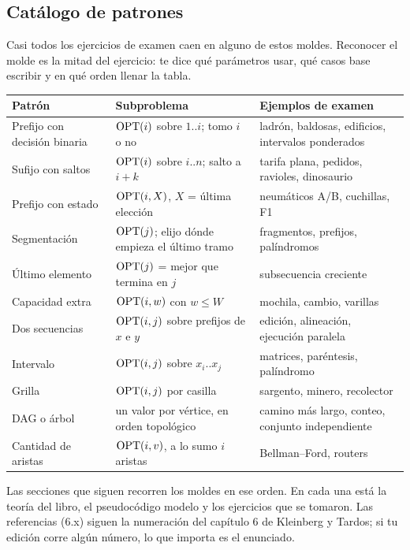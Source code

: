 \subsection{Catálogo de patrones}

Casi todos los ejercicios de examen caen en alguno de estos moldes. Reconocer
el molde es la mitad del ejercicio: te dice qué parámetros usar, qué casos
base escribir y en qué orden llenar la tabla.

{\small
\begin{tabularx}{\textwidth}{@{}>{\raggedright\arraybackslash}p{2.9cm}>{\raggedright\arraybackslash}p{3.4cm}>{\raggedright\arraybackslash}X@{}}
\toprule
\textbf{Patrón} & \textbf{Subproblema} & \textbf{Ejemplos de examen}\\
\midrule
Prefijo con decisión binaria & $\mathrm{OPT}(i)$ sobre $1..i$; tomo $i$ o no & ladrón, baldosas, edificios, intervalos ponderados\\
Sufijo con saltos & $\mathrm{OPT}(i)$ sobre $i..n$; salto a $i+k$ & tarifa plana, pedidos, ravioles, dinosaurio\\
Prefijo con estado & $\mathrm{OPT}(i,X)$, $X$ = última elección & neumáticos A/B, cuchillas, F1\\
Segmentación & $\mathrm{OPT}(j)$; elijo dónde empieza el último tramo & fragmentos, prefijos, palíndromos\\
Último elemento & $\mathrm{OPT}(j)$ = mejor que termina en $j$ & subsecuencia creciente\\
Capacidad extra & $\mathrm{OPT}(i,w)$ con $w\le W$ & mochila, cambio, varillas\\
Dos secuencias & $\mathrm{OPT}(i,j)$ sobre prefijos de $x$ e $y$ & edición, alineación, ejecución paralela\\
Intervalo & $\mathrm{OPT}(i,j)$ sobre $x_i..x_j$ & matrices, paréntesis, palíndromo\\
Grilla & $\mathrm{OPT}(i,j)$ por casilla & sargento, minero, recolector\\
DAG o árbol & un valor por vértice, en orden topológico & camino más largo, conteo, conjunto independiente\\
Cantidad de aristas & $\mathrm{OPT}(i,v)$, a lo sumo $i$ aristas & Bellman--Ford, routers\\
\bottomrule
\end{tabularx}}

Las secciones que siguen recorren los moldes en ese orden. En cada una está la
teoría del libro, el pseudocódigo modelo y los ejercicios que se tomaron.
Las referencias (6.x) siguen la numeración del capítulo 6 de Kleinberg y
Tardos; si tu edición corre algún número, lo que importa es el enunciado.

